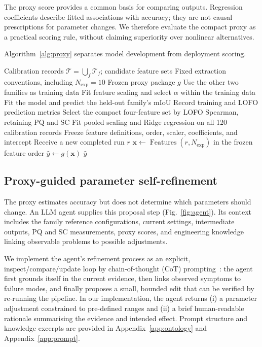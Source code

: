 \documentclass[a4paper,fleqn]{cas-dc}
\begin{document}
{The proxy score provides a common basis for comparing outputs. Regression coefficients describe fitted associations with accuracy; they are not causal prescriptions for parameter changes. We therefore evaluate the compact proxy as a practical scoring rule, without claiming superiority over nonlinear alternatives.

Algorithm~\ref{alg:proxy} separates model development from deployment scoring.

\begin{algorithm}[ht]
\caption{Proxy calibration and deployment scoring}
\label{alg:proxy}
\begin{algorithmic}[1]
\Require Calibration records $\mathcal{T}=\bigcup_f\mathcal{T}_f$; candidate feature sets
\Require Fixed extraction conventions, including $N_{\mathrm{exp}}=10$
\Ensure Frozen proxy package $g$
        \State Use the other two families as training data
        \State Fit feature scaling and select $\alpha$ within the training data
        \State Fit the model and predict the held-out family's mIoU
    \EndFor
    \State Record training and LOFO prediction metrics
\EndFor
\State Select the compact four-feature set by LOFO Spearman, retaining PQ and SC
\State Fit pooled scaling and Ridge regression on all 120 calibration records
\State Freeze feature definitions, order, scaler, coefficients, and intercept
\Statex
\State Receive a new completed run $r$
\State $\mathbf{x}\gets\operatorname{Features}(r,N_{\mathrm{exp}})$ in the frozen feature order
\State $\hat{y}\gets g(\mathbf{x})$
\State \Return $\hat{y}$
\end{algorithmic}
\end{algorithm}


\subsection{Proxy-guided parameter self-refinement}
\label{sec:agent-design}

The proxy estimates accuracy but does not determine which parameters should change. An LLM agent supplies this proposal step (Fig.~\ref{fig:agent}). Its context includes the family reference configurations, current settings, intermediate outputs, PQ and SC measurements, proxy scores, and engineering knowledge linking observable problems to possible adjustments.

We implement the agent's refinement process as an explicit, inspect/compare/update loop by chain-of-thought (CoT) prompting~\cite{wei2023cot,yao2023react}: the agent first grounds itself in the current evidence, then links observed symptoms to failure modes, and finally proposes a small, bounded edit that can be verified by re-running the pipeline. In our implementation, the agent returns (i) a parameter adjustment constrained to pre-defined ranges and (ii) a brief human-readable rationale summarising the evidence and intended effect. Prompt structure and knowledge excerpts are provided in Appendix~\ref{app:ontology} and Appendix~\ref{app:prompt}.

}
\end{document}
